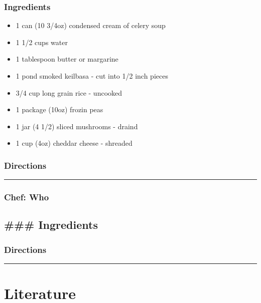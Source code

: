 \documentclass[
]{book}
\providecommand{\tightlist}{%
  \setlength{\itemsep}{0pt}\setlength{\parskip}{0pt}}
\begin{document}
\hypertarget{ingredients-51}{%
\subsection*{Ingredients}\label{ingredients-51}}


\begin{itemize}
\tightlist
\item
  1 can (10 3/4oz) condensed cream of celery soup
\item
  1 1/2 cups water
\item
  1 tablespoon butter or margarine
\item
  1 pond smoked keilbasa - cut into 1/2 inch pieces
\item
  3/4 cup long grain rice - uncooked
\item
  1 package (10oz) frozin peas
\item
  1 jar (4 1/2) sliced mushrooms - draind
\item
  1 cup (4oz) cheddar cheese - shreaded
\end{itemize}

\hypertarget{directions-51}{%
\subsection*{Directions}\label{directions-51}}


\begin{center}\rule{0.5\linewidth}{0.5pt}\end{center}

\hypertarget{chef-who-2}{%
\subsection*{Chef: Who}\label{chef-who-2}}


\hypertarget{ingredients-52}{%
\section*{\#\#\# Ingredients}\label{ingredients-52}}


\hypertarget{directions-52}{%
\subsection*{Directions}\label{directions-52}}


\begin{center}\rule{0.5\linewidth}{0.5pt}\end{center}

\hypertarget{literature}{%
\chapter{Literature}\label{literature}}
\end{document}

